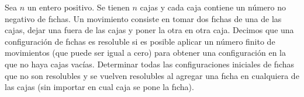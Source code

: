 Sea $n$ un entero positivo. Se tienen $n$ cajas y cada caja contiene un número no negativo
de fıchas. Un movimiento consiste en tomar dos fıchas de una de las cajas, dejar una fuera de las
cajas y poner la otra en otra caja. Decimos que una configuración de fıchas es resoluble si es posible
aplicar un número finito de movimientos (que puede ser igual a cero) para obtener una configuración
en la que no haya cajas vacías. Determinar todas las configuraciones iniciales de fıchas que no son
resolubles y se vuelven resolubles al agregar una fıcha en cualquiera de las cajas (sin importar en cual
caja se pone la fıcha).